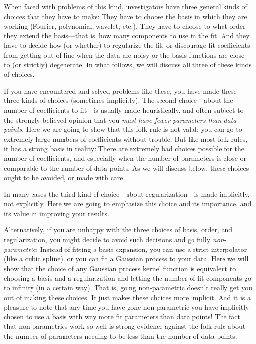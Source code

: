 \documentclass[12pt,letterpaper]{article}
\begin{document}
When faced with problems of this kind, investigators have three general kinds of choices that they have to make:
They have to choose the basis in which they are working (Fourier, polynomial, wavelet, etc.).
They have to choose to what order they extend the basis---that is, how many components to use in the fit.
And they have to decide how (or whether) to regularize the fit, or discourage fit coefficients from getting out of line when the data are noisy or the basis functions are close to (or strictly) degenerate.
In what follows, we will discuss all three of these kinds of choices.

If you have encountered and solved problems like these, you have made these three kinds of choices (sometimes implicitly).
The second choice---about the number of coefficients to fit---is usually made heuristically, and often subject to the strongly believed opinion that you \emph{must have fewer parameters than data points}.
Here we are going to show that this folk rule is not valid; you can go to extremely large numbers of coefficients without trouble.
But like most folk rules, it has a strong basis in reality: There are extremely bad choices possible for the number of coefficients, and especially when the number of parameters is close or comparable to the number of data points.
As we will discuss below, these choices ought to be avoided, or made with care.

In many cases the third kind of choice---about regularization---is made implicitly, not explicitly.
Here we are going to emphasize this choice and its importance, and its value in improving your results.

Alternatively, if you are unhappy with the three choices of basis, order, and regularization, you might decide to avoid such decisions and go fully \emph{non-parametric}:
Instead of fitting a basis expansion, you can use a strict interpolator (like a cubic spline), or you can fit a Gaussian process to your data.
Here we will show that the choice of any Gaussian process kernel function is equivalent to choosing a basis and a regularization and letting the number of fit components go to infinity (in a certain way).
That is, going non-parametric doesn't really get you out of making these choices.
It just makes these choices more implicit.
And it is a pleasure to note that any time you have gone non-parametric you have implicitly chosen to use a basis with way more fit parameters than data points!
The fact that non-parametrics work so well is strong evidence against the folk rule about the number of parameters needing to be less than the number of data points.
\end{document}
